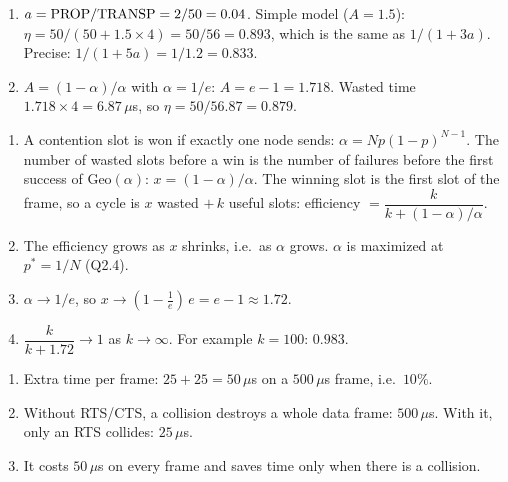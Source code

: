 \begin{enumerate}
  \item[(a)] $a=\text{PROP}/\text{TRANSP}=2/50=0.04$. Simple model ($A=1.5$): $\eta=50/(50+1.5\times4)=50/56=0.893$, which is the same as $1/(1+3a)$. Precise: $1/(1+5a)=1/1.2=0.833$.
  \item[(b)] $A=(1-\alpha)/\alpha$ with $\alpha=1/e$: $A=e-1=1.718$. Wasted time $1.718\times4=6.87\,\mu$s, so $\eta=50/56.87=0.879$.
\end{enumerate}

\begin{enumerate}
  \item[(a)] A contention slot is won if exactly one node sends: $\alpha=Np(1-p)^{N-1}$. The number of wasted slots before a win is the number of failures before the first success of $\text{Geo}(\alpha)$: $x=(1-\alpha)/\alpha$. The winning slot is the first slot of the frame, so a cycle is $x$ wasted $+\,k$ useful slots: efficiency $=\dfrac{k}{k+(1-\alpha)/\alpha}$.
  \item[(b)] The efficiency grows as $x$ shrinks, i.e.\ as $\alpha$ grows. $\alpha$ is maximized at $p^*=1/N$ (Q2.4).
  \item[(c)] $\alpha\to1/e$, so $x\to(1-\frac1e)\,e=e-1\approx1.72$.
  \item[(d)] $\dfrac{k}{k+1.72}\to1$ as $k\to\infty$. For example $k=100$: $0.983$.
\end{enumerate}

\begin{enumerate}
  \item[(a)] Extra time per frame: $25+25=50\,\mu$s on a $500\,\mu$s frame, i.e.\ $10\%$.
  \item[(b)] Without RTS/CTS, a collision destroys a whole data frame: $500\,\mu$s. With it, only an RTS collides: $25\,\mu$s.
  \item[(c)] It costs $50\,\mu$s on every frame and saves time only when there is a collision.
\end{enumerate}


